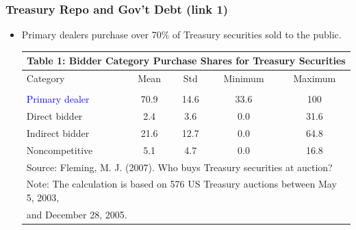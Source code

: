 \documentclass[10pt]{beamer}
\begin{document}
\begin{frame}
\frametitle{Treasury Repo and Gov't Debt (link 1)}
\begin{itemize}
\item Primary dealers purchase over 70\% of Treasury securities sold to the public.\\
\vspace{3mm}
\begin{center}
{\footnotesize%
\begin{tabular}{lcccc} 
\multicolumn{5}{c}{Table 1: Bidder Category Purchase Shares for Treasury Securities}\\\hline
Category & Mean & Std & Minimum & Maximum \\ \hline
 &  &  &  &  \\
\textcolor{blue}{Primary dealer} & 70.9 & 14.6 & 33.6 & 100 \\
Direct bidder & 2.4 & 3.6 & 0.0 & 31.6 \\
Indirect bidder & 21.6 & 12.7 & 0.0 & 64.8 \\
Noncompetitive & 5.1 & 4.7 & 0.0 & 16.8 \\ \hline
\multicolumn{5}{l}{ Source: Fleming, M. J. (2007). Who buys Treasury securities at auction?} \\
\multicolumn{5}{l}{Note: The calculation is based on 576 US Treasury auctions between May 5, 2003, }\\
\multicolumn{5}{l}{\hspace{7mm} and December 28, 2005.}
\end{tabular}
}%
\end{center}
\end{itemize}
\end{frame}
\end{document}
